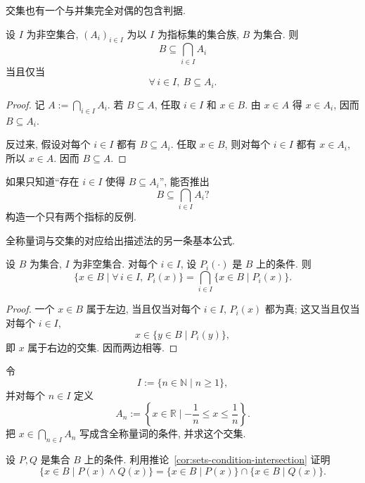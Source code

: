 \documentclass[usesamecnt, thmcnt=section, lang=cn, newtx, 10pt, scheme=chinese]{elegantbook}
\begin{document}
交集也有一个与并集完全对偶的包含判据.

\begin{proposition}\label{prop:sets-intersection-criterion}
设 $I$ 为非空集合, $(A_i)_{i\in I}$ 为以 $I$ 为指标集的集合族, $B$ 为集合. 则
\[
 B\subseteq\bigcap_{i\in I}A_i
\]
当且仅当
\[
 \forall\,i\in I,\ B\subseteq A_i.
\]
\end{proposition}

\begin{proof}
记 $A:=\bigcap_{i\in I}A_i$. 若 $B\subseteq A$, 任取 $i\in I$ 和 $x\in B$. 由 $x\in A$ 得 $x\in A_i$, 因而 $B\subseteq A_i$.

反过来, 假设对每个 $i\in I$ 都有 $B\subseteq A_i$. 任取 $x\in B$, 则对每个 $i\in I$ 都有 $x\in A_i$, 所以 $x\in A$. 因而 $B\subseteq A$.
\end{proof}



\begin{exercise}\label{ex:sets-intersection-criterion-02}
如果只知道``存在 $i\in I$ 使得 $B\subseteq A_i$'', 能否推出
\[
 B\subseteq\bigcap_{i\in I}A_i?
\]
构造一个只有两个指标的反例.
\end{exercise}

全称量词与交集的对应给出描述法的另一条基本公式.

\begin{corollary}\label{cor:sets-condition-intersection}
设 $B$ 为集合, $I$ 为非空集合. 对每个 $i\in I$, 设 $P_i(\cdot)$ 是 $B$ 上的条件. 则
\[
 \{x\in B\mid \forall\,i\in I,\ P_i(x)\}
 =
 \bigcap_{i\in I}\{x\in B\mid P_i(x)\}.
\]
\end{corollary}

\begin{proof}
一个 $x\in B$ 属于左边, 当且仅当对每个 $i\in I$, $P_i(x)$ 都为真; 这又当且仅当对每个 $i\in I$,
\[
 x\in\{y\in B\mid P_i(y)\},
\]
即 $x$ 属于右边的交集. 因而两边相等.
\end{proof}

\begin{exercise}\label{ex:sets-intersection-builder-01}
令
\[
 I:=\{n\in\mathbb N\mid n\geq1\},
\]
并对每个 $n\in I$ 定义
\[
 A_n:=\left\{x\in\mathbb R\mid -\frac1n\leq x\leq\frac1n\right\}.
\]
把 $x\in\bigcap_{n\in I}A_n$ 写成含全称量词的条件, 并求这个交集.
\end{exercise}

\begin{exercise}\label{ex:sets-intersection-builder-02}
设 $P ,Q $ 是集合 $B$ 上的条件. 利用推论~\ref{cor:sets-condition-intersection} 证明
\[
 \{x\in B\mid P(x)\wedge Q(x)\}
 =
 \{x\in B\mid P(x)\}\cap\{x\in B\mid Q(x)\}.
\]
\end{exercise}
\end{document}
